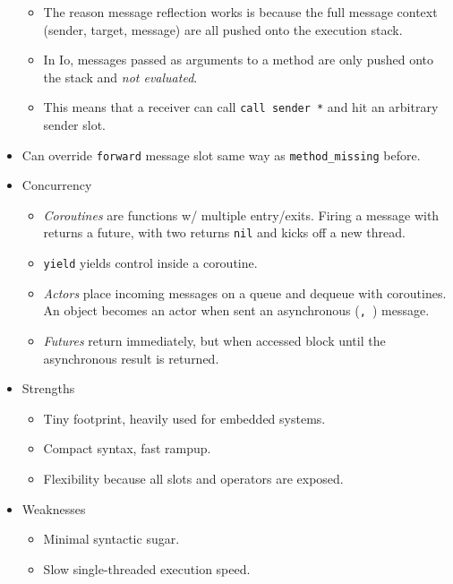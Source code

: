 \documentclass[10pt, twocolumn, landscape]{article}
\begin{document}
\begin{itemize}
        \begin{itemize}
            \item The reason message reflection works is because the full
                message context (sender, target, message) are all pushed onto
                the execution stack.
            \item In Io, messages passed as arguments to a method are only
                pushed onto the stack and \emph{not evaluated}.
            \item This means that a receiver can call \texttt{call sender *} and
                hit an arbitrary sender slot.
        \end{itemize}
    \item Can override \texttt{forward} message slot same way as
        \texttt{method\_missing} before.
    \item Concurrency
        \begin{itemize}
            \item \emph{Coroutines} are functions w/ multiple entry/exits. Firing a
                message with \texttt{\@} returns a future, with two
                \texttt{\@\@} returns \texttt{nil} and kicks off a new thread.
            \item \texttt{yield} yields control inside a coroutine.
            \item \emph{Actors} place incoming messages on a queue and dequeue
                with coroutines. An object becomes an actor when sent an
                asynchronous (\texttt{\@, \@\@}) message.
            \item \emph{Futures} return immediately, but when accessed block
                until the asynchronous result is returned.
        \end{itemize}
    \item Strengths
        \begin{itemize}
            \item Tiny footprint, heavily used for embedded systems.
            \item Compact syntax, fast rampup.
            \item Flexibility because all slots and operators are exposed.
        \end{itemize}
    \item Weaknesses
        \begin{itemize}
            \item Minimal syntactic sugar.
            \item Slow single-threaded execution speed.
        \end{itemize}
\end{itemize}
\end{document}
